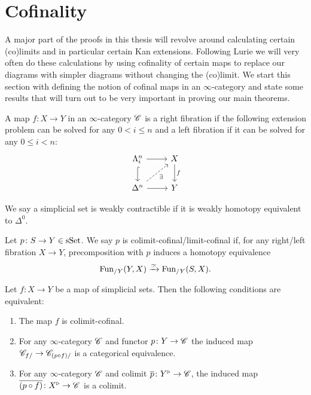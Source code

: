 \documentclass[../../thesis.tex]{subfiles}
\begin{document}
\section{Cofinality}
A major part of the proofs in this thesis will revolve around calculating certain (co)limits and in particular certain Kan extensions.
Following Lurie we will very often do these calculations by using cofinality of certain maps to replace our diagrams with simpler diagrams without changing the (co)limit.
We start this section with defining the notion of cofinal maps in an $\infty$-category and state some results that will turn out to be very important in proving our main theorems.
\begin{definition}
    A map $f\colon X \to Y$ in an $\infty$-category $\mathscr{C}$ is a right fibration if the following extension problem can be solved for any $0<i\leq n$ and a left fibration if it can be solved for any $0\leq i <n$:
    \[\begin{tikzcd}
            {\Lambda_i^n} & X \\
            {\Delta^n} & Y
            \arrow[from=1-1, to=1-2]
            \arrow[hook, from=1-1, to=2-1]
            \arrow[from=2-1, to=2-2]
            \arrow["f", from=1-2, to=2-2]
            \arrow["\exists"', dashed, from=2-1, to=1-2]
        \end{tikzcd}\]
\end{definition}
\begin{definition}
    We say a simplicial set is weakly contractible if it is weakly homotopy equivalent to $\Delta^0$.
\end{definition}
\begin{definition}{\cite[\href{https://kerodon.net/tag/02N1}{Definition 02N1}]{kerodon}}
    Let \(p\colon S\to Y \in \mathrm{sSet} \). We say $p$ is colimit-cofinal/limit-cofinal if, for any right/left fibration $X\to Y$, precomposition with $p$ induces a homotopy equivalence
    \[
        \mathrm{Fun}_{/Y}(Y,X) \xrightarrow{\simeq} \mathrm{Fun}_{/Y}(S,X).
    \]
\end{definition}
\begin{proposition}
    Let $f\colon X \to Y$ be a map of simplicial sets.
    Then the following conditions are equivalent:
    \begin{enumerate}
        \item The map $f$ is colimit-cofinal.
        \item For any $\infty$-category $\mathscr{C}$ and functor $p\colon Y \to \mathscr{C}$ the induced map $\mathscr{C}_{f/} \to \mathscr{C}_{(p \circ f)/}$ is a categorical equivalence.
        \item For any $\infty$-category $\mathscr{C}$ and colimit $\overline{p}\colon Y^{\triangleright} \to \mathscr{C}$, the induced map $\overline{(p \circ f)}\colon X^{\triangleright}\to \mathscr{C}$ is a colimit.
    \end{enumerate}
\end{proposition}
\end{document}
